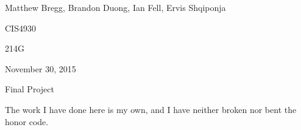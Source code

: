 \documentclass{article}
\begin{document}
\begin{flushright}
Matthew Bregg, Brandon Duong, Ian Fell, Ervis Shqiponja
\end{flushright}
\begin{flushright}
CIS4930
\end{flushright}
\begin{flushright}
214G
\end{flushright}
\begin{flushright}
November 30, 2015
\end{flushright}
\begin{flushright}
Final Project 
\end{flushright}
The work I have done here is my own, and I have neither broken nor bent the honor code.
\newline
\newline
\newline
\end{document}
